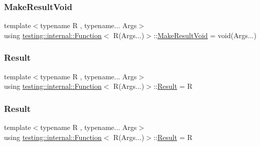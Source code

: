 \subsubsection{\texorpdfstring{MakeResultVoid}{MakeResultVoid}\hspace{0.1cm}{\footnotesize\ttfamily [2/2]}}
{\footnotesize\ttfamily template$<$typename R , typename... Args$>$ \\
using \mbox{\hyperlink{structtesting_1_1internal_1_1_function}{testing\+::internal\+::\+Function}}$<$ R(Args...)$>$\+::\mbox{\hyperlink{structtesting_1_1internal_1_1_function_3_01_r_07_args_8_8_8_08_4_a763920d3647641e1100bc4ade26d1d0c}{Make\+Result\+Void}} =  void(Args...)}

\mbox{\label{structtesting_1_1internal_1_1_function_3_01_r_07_args_8_8_8_08_4_a71efbc408f9ce64e36e2cc41df0da194}} 
\subsubsection{\texorpdfstring{Result}{Result}\hspace{0.1cm}{\footnotesize\ttfamily [1/2]}}
{\footnotesize\ttfamily template$<$typename R , typename... Args$>$ \\
using \mbox{\hyperlink{structtesting_1_1internal_1_1_function}{testing\+::internal\+::\+Function}}$<$ R(Args...)$>$\+::\mbox{\hyperlink{structtesting_1_1internal_1_1_function_3_01_r_07_args_8_8_8_08_4_a71efbc408f9ce64e36e2cc41df0da194}{Result}} =  R}

\mbox{\label{structtesting_1_1internal_1_1_function_3_01_r_07_args_8_8_8_08_4_a71efbc408f9ce64e36e2cc41df0da194}} 
\subsubsection{\texorpdfstring{Result}{Result}\hspace{0.1cm}{\footnotesize\ttfamily [2/2]}}
{\footnotesize\ttfamily template$<$typename R , typename... Args$>$ \\
using \mbox{\hyperlink{structtesting_1_1internal_1_1_function}{testing\+::internal\+::\+Function}}$<$ R(Args...)$>$\+::\mbox{\hyperlink{structtesting_1_1internal_1_1_function_3_01_r_07_args_8_8_8_08_4_a71efbc408f9ce64e36e2cc41df0da194}{Result}} =  R}



